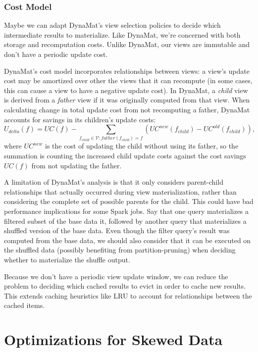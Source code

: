 \documentclass[12pt]{article}
\begin{document}
\subsubsection{Cost Model}

Maybe we can adapt DynaMat's \cite{dynamat} view selection policies to decide
which intermediate results to materialize.  Like DynaMat, we're concerned with
both storage and recomputation costs.  Unlike DynaMat, our views are immutable
and don't have a periodic update cost.

DynaMat's cost model incorporates relationships between views: a view's
update cost may be amortized over other the views that it can recompute
(in some cases, this can cause a view to have a negative update cost).
In DynaMat, a \emph{child} view is derived from a \emph{father} view if
it was originally computed from that view.  When calculating change in total
update cost from not recomputing a father, DynaMat accounts for savings in its
children's update costs:
\[
    U_{delta}(f)
    =
    UC(f)
    - \sum\limits_{f_{child} \in \mathcal{V} : father(f_{child}) = f}
    \left(UC^{new}(f_{child}) - UC^{old}(f_{child})\right),
\]
where $UC^{new}$ is the cost of updating the child without using its father,
so the summation is counting the increased child update costs against the cost
savings $UC(f)$ from not updating the father.

A limitation of DynaMat's analysis is that it only considers parent-child
relationships that actually occurred during view materialization, rather than
considering the complete set of possible parents for the child.
This could have bad performance implications for some Spark jobs.  Say that one 
query materializes a filtered subset of the base data it, followed by another
query that materializes a shuffled version of the base data.  Even though the
filter query's result was computed from the base data, we should also consider
that it can be executed on the shuffled data (possibly benefiting from
partition-pruning) when deciding whether to materialize the shuffle output.

Because we don't have a periodic view update window, we can reduce the problem
to deciding which cached results to evict in order to cache new results.
This extends caching heuristics like LRU to account for relationships between
the cached items.

\section{Optimizations for Skewed Data}
\end{document}
